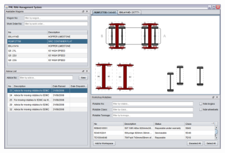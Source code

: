 \documentclass[a4paper,10pt,twocolumn]{article}
\begin{document}
  \begin{figure}[!h]
  \centering
  \includegraphics[scale=0.18]{images/02-workspace-custom-layout.png}
  \end{figure}
\end{document}
